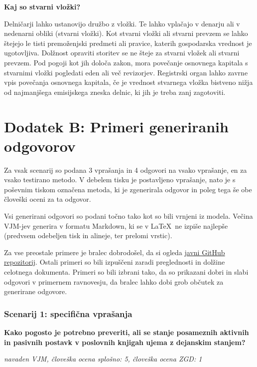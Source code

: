 \documentclass[a4paper,12pt,openright]{book}
\begin{document}
\textbf{Kaj so stvarni vložki?}

Delničarji lahko ustanovijo družbo z vložki. Te lahko vplačajo v denarju ali v nedenarni obliki (stvarni vložki). Kot stvarni vložki ali stvarni prevzem se lahko štejejo le tisti premoženjski predmeti ali pravice, katerih gospodarska vrednost je ugotovljiva. Dolžnost opraviti storitev se ne šteje za stvarni vložek ali stvarni prevzem. Pod pogoji kot jih določa zakon, mora povečanje osnovnega kapitala s stvarnimi vložki pogledati eden ali več revizorjev. Registrski organ lahko zavrne vpis povečanja osnovnega kapitala, če je vrednost stvarnega vložka bistveno nižja od najmanjšega emisijskega zneska delnic, ki jih je treba zanj zagotoviti.

{}
\chapter*{Dodatek B: Primeri generiranih odgovorov}
\label{appendix_b}

Za vsak scenarij so podana 3 vprašanja in 4 odgovori na vsako vprašanje, en za vsako testirano metodo. V debelem tisku je postavljeno vprašanje, nato je s poševnim tiskom označena metoda, ki je zgenerirala odgovor in poleg tega še obe človeški oceni za ta odgovor.

Vsi generirani odgovori so podani točno tako kot so bili vrnjeni iz modela. Večina VJM-jev generira v formatu Markdown, ki se v \LaTeX \, ne izpiše najlepše (predvsem odebeljen tisk in alineje, ter prelomi vrstic).

Za vse preostale primere je bralec dobrodošel, da si ogleda \href{https://github.com/pizdoponi/diploma}{javni GitHub repozitorij}. Ostali primeri so bili izpuščeni zaradi preglednosti in dolžine celotnega dokumenta. Primeri so bili izbrani tako, da so prikazani dobri in slabi odgovori v primernem ravnovesju, da bralec lahko dobi grob občutek za generirane odgovore.

\subsection*{Scenarij 1: specifična vprašanja}

\textbf{Kako pogosto je potrebno preveriti, ali se stanje posameznih aktivnih in pasivnih postavk v poslovnih knjigah ujema z dejanskim stanjem?}

\textit{navaden VJM, človeška ocena splošno: 5, človeška ocena ZGD: 1}
\end{document}
